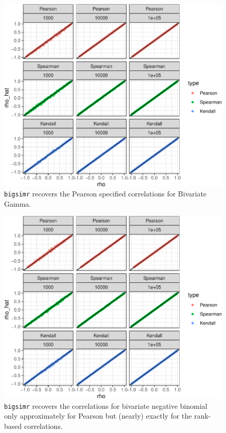 \documentclass{article}
\begin{document}
\begin{figure}
\centering
\includegraphics{ch040-biGammaPlot-1.pdf}
\caption{\label{fig:ch040-biGammaPlot}\texttt{bigsimr} recovers the
Pearson specified correlations for Bivariate Gamma.}
\end{figure}

\begin{figure}
\centering
\includegraphics{ch040-biNegBinPlot-1.pdf}
\caption{\label{fig:ch040-biNegBinPlot}\texttt{bigsimr} recovers the
correlations for bivariate negative binomial only approximately for
Pearson but (nearly) exactly for the rank-based correlations.}
\end{figure}
\end{document}
